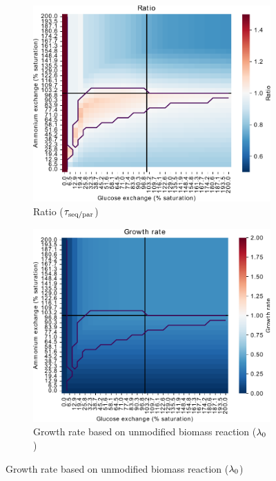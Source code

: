 \begin{figure}
  \centering
  \begin{subfigure}[t]{0.45\textwidth}
  \centering
    \includegraphics[width=\linewidth]{ec_grid_glc_amm_ratio}
    \caption{
      Ratio ($\tau_{\mathrm{seq}/\mathrm{par}}$)
    }
    \label{fig:model-grid-glc-ratio}
  \end{subfigure}%
  \begin{subfigure}[t]{0.45\textwidth}
  \centering
    \includegraphics[width=\linewidth]{ec_grid_glc_amm_growthrate}
    \caption{
      Growth rate based on unmodified biomass reaction ($\lambda_{0}$)
    }
    \label{fig:model-grid-glc-growthrate}
  \end{subfigure}


\end{figure}
